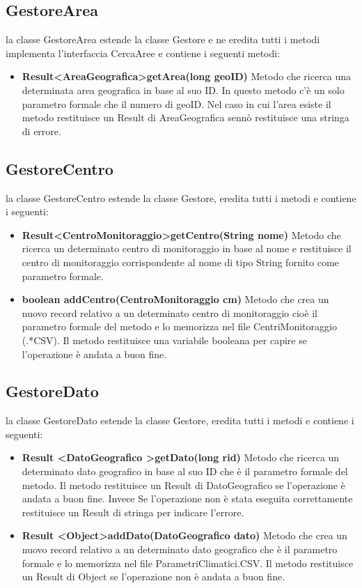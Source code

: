 \documentclass[a4paper, 12pt]{report}
\begin{document}
			\subsection{GestoreArea}
			la classe GestoreArea estende la classe Gestore e ne eredita tutti i metodi
			implementa l'interfaccia CercaAree e contiene i seguenti metodi:
			\begin{itemize}
				\item \textbf{Result\textless AreaGeografica\textgreater getArea(long geoID)}
				Metodo che ricerca una determinata area geografica in base al suo ID. In questo metodo c'è un solo parametro formale che il numero di geoID. Nel caso in cui l'area esiste il metodo restituisce un Result di AreaGeografica sennò restituisce una stringa di errore.
			\end{itemize}

			\subsection{GestoreCentro}
			la classe GestoreCentro estende la classe Gestore, eredita tutti i metodi e contiene i seguenti:
			\begin{itemize}
				\item \textbf{Result\textless CentroMonitoraggio\textgreater getCentro(String nome)}
				Metodo che ricerca un determinato centro di monitoraggio in base al nome e restituisce il centro di monitoraggio corrispondente al nome di tipo String fornito come parametro formale.
				\item \textbf {boolean addCentro(CentroMonitoraggio cm)}
				Metodo che crea un nuovo record relativo a un determinato centro di monitoraggio cioè il parametro formale del metodo e lo memorizza nel file CentriMonitoraggio (.*CSV). Il metodo restituisce una variabile booleana per capire se l'operazione è andata a buon fine.
			\end{itemize}

			\subsection{GestoreDato}
			la classe GestoreDato estende la classe Gestore, eredita tutti i metodi e contiene i seguenti:
			\begin{itemize}
				\item \textbf{Result \textless DatoGeografico \textgreater getDato(long rid)}
				Metodo che ricerca un determinato dato geografico in base al suo ID che è il parametro formale del metodo. Il metodo restituisce un Result di DatoGeografico se l'operazione è andata a buon fine. Invece Se l'operazione non è stata eseguita correttamente restituisce un Result di stringa per indicare l'errore.
				\item \textbf {Result \textless Object\textgreater addDato(DatoGeografico dato)}
				Metodo che crea un nuovo record relativo a un determinato dato geografico che è il parametro formale e lo memorizza nel file ParametriClimatici.CSV. Il metodo restituisce un Result di Object se l'operazione non è andata a buon fine.
			\end{itemize}
\end{document}
